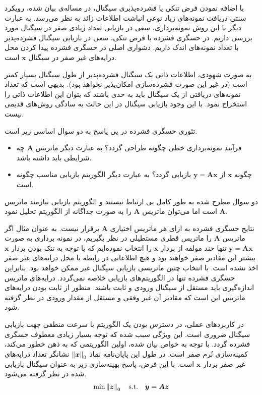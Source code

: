با اضافه نمودن فرض تنکی یا فشرده‌پذیری سیگنال، در مساله‌ی بیان شده، رویکرد سنتی دریافت نمونه‌های زیاد نوعی انباشت اطلاعات زائد به نظر می‌رسد. به عبارت دیگر با این روش نمونه‌برداری، سعی در بازیابی تعداد زیادی صفر در سیگنال مورد بررسی داریم. در حسگری فشرده با فرض تنکی، سعی در بازیابی سیگنال فشرده‌پذیر با تعداد نمونه‌های اندک داریم. دشواری اصلی در حسگری فشرده پیدا کردن محل درایه‌های غیر صفر در سیگنال 
$\bm{x}$
است. 


به صورت شهودی، اطلاعات ذاتی یک سیگنال فشرده‌پذیر از طول سیگنال بسیار کمتر است (در غیر این صورت فشرده‌سازی امکان‌پذیر نخواهد بود). بدیهی است که تعداد نمونه‌های دریافتی از یک سیگنال باید به حدی باشند که بتوان این اطلاعات ذاتی را استخراج نمود. با این وجود بازیابی سیگنال در این حالت به سادگی روش‌های قدیمی نیست. 

تئوری حسگری فشرده در پی پاسخ به دو سوال اساسی زیر است.
\begin{itemize}
\item{
فرآیند نمونه‌برداری خطی چگونه طراحی گردد؟ به عبارت دیگر ماتریس 
$\bm{A}$
چه شرایطی باید داشته باشد.
}
\item{
چگونه 
$\bm{x}$
از
$\bm{y}=\bm{A}\bm{x}$
بازیابی گردد؟
به عبارت دیگر الگوریتم بازیابی مناسب چگونه است.
}
\end{itemize}

دو سوال مطرح شده به طور کامل بی ارتباط نیستند و الگوریتم بازیابی نیازمند ماتریس 
$\bm{A}$
است اما می‌توان ماتریس 
$\bm{A}$
را به صورت جداگانه از الگوریتم تحلیل نمود.

نتایج حسگری فشرده به ازای هر ماتریس اختیاری 
$\bm{A}$
برقرار نیست. به عنوان مثال اگر ماتریس 
$\bm{A}$
را ماتریس قطری مستطیلی در نظر بگیریم،‌ در نمونه برداری به صورت
$\bm{y}=\bm{A}\bm{x}$
تنها چند مولفه از بردار 
$\bm{x}$
را انتخاب نموده‌ایم که با توجه به تنک بودن بردار 
$\bm{x}$
بیشتر این مقادیر صفر خواهند بود و هیچ اطلاعاتی در رابطه با محل درایه‌های غیر صفر اخذ نشده است. با انتخاب چنین ماتریسی بازیابی سیگنال غیر ممکن خواهد بود. بنابراین حسگری فشرده تنها در الگوریتم‌های بازیابی خلاصه نمی‌گردد. درایه‌های ماتریس اندازه‌گیری باید مستقل از سیگنال ورودی و ثابت باشند. منظور از ثابت بودن درایه‌های ماتریس این است که مقادیر آن غیر وفقی و مستقل از مقدار ورودی در نظر گرفته شود. 

در کاربرد‌های عملی، در دسترس بودن یک الگوریتم با سرعت منطقی جهت بازیابی سیگنال ضروری است. این ویژگی سبب شده که توجه بسیار زیادی معطوف حسگری فشرده گردد. با توجه به خواص بیان شده، اولین الگوریتمی که به ذهن خطور می‌کند، کمینه‌سازی نُرم صفر است. در طول این پایان‌نامه  نماد 
$\left\lVert\bm{x}\right\rVert_{0}$
نشانگر تعداد درایه‌های غیر صفر بردار
$\bm{x}$
است. با این فرض، پاسخ بهینه‌سازی زیر به عنوان سیگنال بازیابی شده در نظر گرفته می‌شود.
\begin{align}
\label{eq:eq2}
\min \left\lVert\bm{z}\right\rVert_{0} \quad \text{s.t.}\quad \bm{y}= \bm{A}\bm{z}
\end{align}

